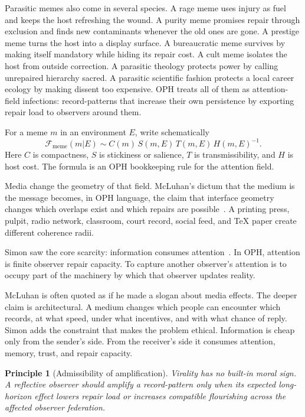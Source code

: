 \documentclass[11pt]{article}
\newtheorem{principle}[definition]{Principle}
\theoremstyle{remark}
\theoremstyle{plain}
\begin{document}
Parasitic memes also come in several species. A rage meme uses injury as fuel
and keeps the host refreshing the wound. A purity meme promises repair through
exclusion and finds new contaminants whenever the old ones are gone. A prestige
meme turns the host into a display surface. A bureaucratic meme survives by
making itself mandatory while hiding its repair cost. A cult meme isolates the
host from outside correction. A parasitic theology protects power by calling
unrepaired hierarchy sacred. A parasitic scientific fashion protects a local
career ecology by making dissent too expensive. OPH treats all of them as
attention-field infections: record-patterns that increase their own persistence
by exporting repair load to observers around them.

For a meme \(m\) in an environment \(E\), write schematically
\[
\mathcal F_{\mathrm{meme}}(m|E)
\sim
C(m)\,S(m,E)\,T(m,E)\,H(m,E)^{-1}.
\]
Here \(C\) is compactness, \(S\) is stickiness or salience, \(T\) is
transmissibility, and \(H\) is host cost. The formula is an OPH bookkeeping
rule for the attention field.

Media change the geometry of that field. McLuhan's dictum that the medium is
the message becomes, in OPH language, the claim that interface geometry changes
which overlaps exist and which repairs are possible~\cite{McLuhan1964}. A
printing press, pulpit, radio network, classroom, court record, social feed,
and TeX paper create different coherence radii.

Simon saw the core scarcity: information consumes attention~\cite{Simon1971}.
In OPH, attention is finite observer repair capacity. To capture another
observer's attention is to occupy part of the machinery by which that observer
updates reality.

McLuhan is often quoted as if he made a slogan about media effects. The deeper
claim is architectural. A medium changes which people can encounter which
records, at what speed, under what incentives, and with what chance of reply.
Simon adds the constraint that makes the problem ethical. Information is cheap
only from the sender's side. From the receiver's side it consumes attention,
memory, trust, and repair capacity.

\begin{principle}[Admissibility of amplification]
Virality has no built-in moral sign. A reflective observer should amplify a
record-pattern only when its expected long-horizon effect lowers repair load or
increases compatible flourishing across the affected observer federation.
\end{principle}
\end{document}
